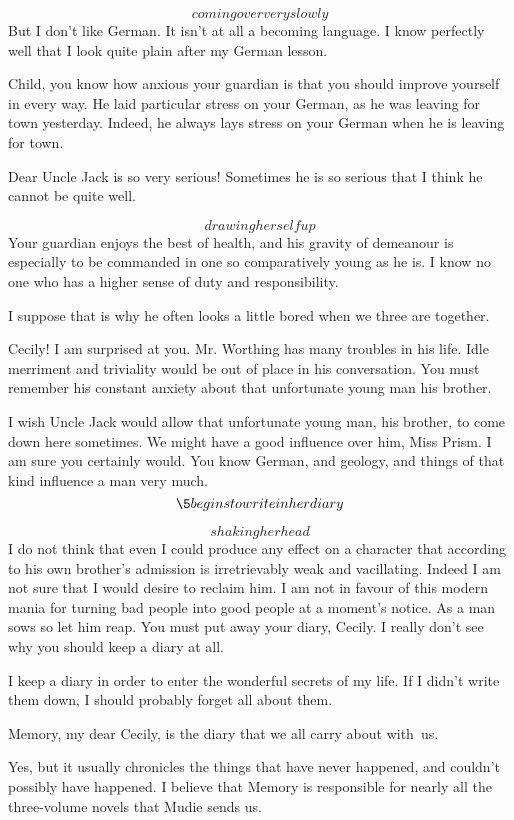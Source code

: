 \documentclass{book}
\begin{document}
\5\[coming over very slowly\]  But I don't like German.  It
isn't at all a becoming language.  I know perfectly well that I
look quite plain after my German lesson.

\6 Child, you know how anxious your guardian is that you
should improve yourself in every way.  He laid particular stress on
your German, as he was leaving for town yesterday.  Indeed, he
always lays stress on your German when he is leaving for town.

\5  Dear Uncle Jack is so very serious!  Sometimes he is so
serious that I think he cannot be quite well.

\6  \[drawing herself up\]  Your guardian enjoys the best
of health, and his gravity of demeanour is especially to be
commanded in one so comparatively young as he is.
I know no one who has a higher sense of duty and responsibility.

\5  I suppose that is why he often looks a little bored when
we three are together.

\6  Cecily!  I am surprised at you.  Mr. Worthing has many
troubles in his life.  Idle merriment and triviality would be out
of place in his conversation.  You must remember his constant
anxiety about that unfortunate young man his brother.

\5  I wish Uncle Jack would allow that unfortunate young man,
his brother, to come down here sometimes.  We might have a good
influence over him, Miss Prism.  I am sure you certainly would.
You know German, and geology, and things of that kind influence a
man very much.\[\5 begins to write in her diary\]

\6  \[shaking her head\]  I do not think that even I could
produce any effect on a character that according to his own
brother's admission is irretrievably weak and vacillating.  Indeed
I am not sure that I would desire to reclaim him.  I am not in
favour of this modern mania for turning bad people into good people
at a moment's notice.  As a man sows so let him reap.  You must put
away your diary, Cecily.  I really don't see why you should keep a
diary at all.

\5  I keep a diary in order to enter the wonderful secrets of
my life.  If I didn't write them down, I should probably forget all
about them.

\6  Memory, my dear Cecily, is the diary that we all carry
about with~us.

\5  Yes, but it usually chronicles the things that have never
happened, and couldn't possibly have happened.  I believe that
Memory is responsible for nearly all the three-volume novels that
Mudie sends us.
\end{document}
